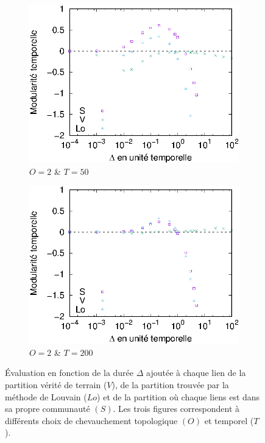 \begin{figure}[h]
	\begin{subfigure}{0.495\textwidth}
		\includegraphics[width=\textwidth]{img/Qualite/Fonc/comp_50_T_50_O_2_Q_1.eps}
		\caption{$O=2$ \& $T=50$}
		\label{fig:versqualite_fonc_test3}
	\end{subfigure}
	\begin{subfigure}{0.495\textwidth}
		\includegraphics[width=\textwidth]{img/Qualite/Fonc/comp_100_T_200_O_2_Q_1.eps}
		\caption{$O=2$ \& $T=200$}
		\label{fig:versqualite_fonc_test4}
	\end{subfigure}	
	\caption{Évaluation en fonction de la durée $\Delta$ ajoutée à chaque lien de la partition vérité de terrain ($V$), de la partition trouvée par la méthode de Louvain ($Lo$) et de la partition où chaque liens est dans sa propre communauté $(S)$.
	Les trois figures correspondent à différents choix de chevauchement topologique $(O)$ et temporel ($T$).}
	\label{fig:versqualite_fonc_test}
\end{figure}
\bigskip

